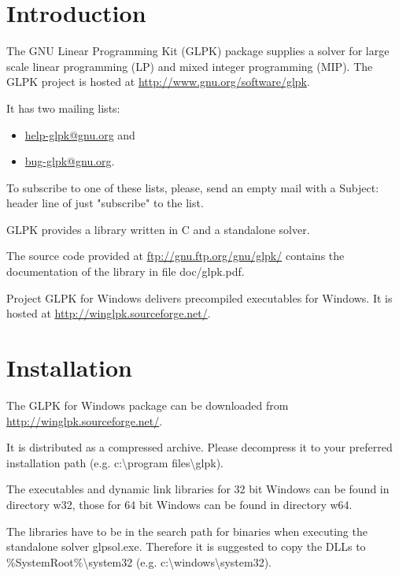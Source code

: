 \documentclass[a4paper,11pt]{report}
\begin{document}
\chapter{Introduction}
The GNU Linear Programming Kit (GLPK)\cite{GLPK} package supplies a solver for
large scale linear programming (LP) and mixed integer programming (MIP).
The GLPK project is hosted at
\linebreak\href{http://www.gnu.org/software/glpk}{http://www.gnu.org/software/glpk}.

It has two mailing lists: 
\begin{itemize}
\item\href{mailto:help-glpk@gnu.org}{help-glpk@gnu.org} and 
\item\href{mailto:bug-glpk@gnu.org}{bug-glpk@gnu.org}.
\end{itemize}
To subscribe to one of these lists, please, send an empty mail with a Subject:
header line of just "subscribe" to the list.

GLPK provides a library written in C and a standalone solver.

The source code provided at
\href{ftp://gnu.ftp.org/gnu/glpk/}{ftp://gnu.ftp.org/gnu/glpk/}
contains the documentation of the library in file doc/glpk.pdf.

Project GLPK for Windows delivers precompiled executables for Windows.
It is hosted at
\linebreak\href{http://winglpk.sourceforge.net/}{http://winglpk.sourceforge.net/}.

\chapter{Installation}
The GLPK for Windows package can be downloaded from
\linebreak\href{http://winglpk.sourceforge.net/}{http://winglpk.sourceforge.net/}.

It is distributed as a compressed archive. Please decompress it to your
preferred installation path
(e.g. c:\textbackslash program files\textbackslash glpk).

The executables and dynamic link libraries for 32 bit Windows can be found in
directory w32, those for 64 bit Windows can be found in directory w64.

The libraries have to be in the search path for binaries when executing the
standalone solver glpsol.exe. Therefore it is suggested to copy the DLLs to
\%SystemRoot\%\textbackslash system32
(e.g. c:\textbackslash windows\textbackslash system32).
\end{document}
